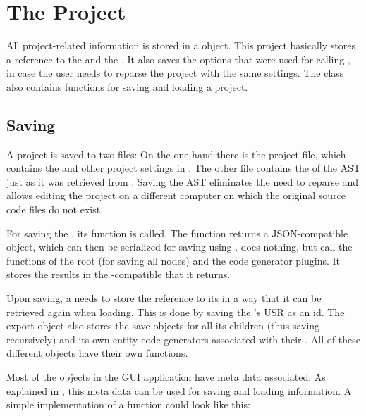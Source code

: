 \section{The Project}
\label{sec:Project}

All project-related information is stored in a  object. This project basically stores a reference to the  and the . It also saves the options that were used for calling , in case the user needs to reparse the project with the same settings. The  class also contains functions for saving and loading a project.

\subsection{Saving}

A project is saved to two files: On the one hand there is the project file, which contains the  and other project settings in . The other file contains the  of the  AST just as it was retrieved from . Saving the  AST eliminates the need to reparse and allows editing the project on a different computer on which the original source code files do not exist.

For saving the , its  function is called. The function returns a JSON-compatible object, which can then be serialized for saving using .  does nothing, but call the  functions of the root \linebreak{} (for saving all nodes) and the code generator plugins. It stores the results in the -compatible  that it returns.

Upon saving, a  needs to store the reference to its  in a way that it can be retrieved again when loading. This is done by saving the 's USR as an id. The export object also stores the save objects for all its children (thus saving recursively) and its own entity code generators associated with their . All of these different  objects have their own  functions.

Most of the objects in the GUI application have meta data associated. As explained in , this meta data can be used for saving and loading information. A simple implementation of a  function could look like this:


